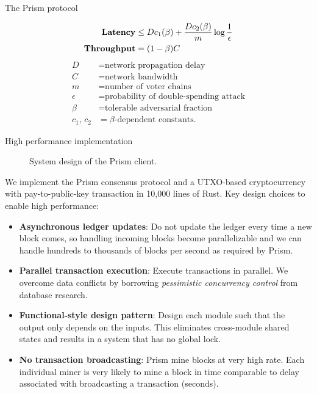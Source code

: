 \documentclass[final]{beamer}
\newlength{\colwidth}
\begin{document}
\begin{frame}[t]
\begin{columns}[t]
\begin{column}{\colwidth}
\begin{alertblock}{The Prism protocol}
  \begin{multicols}{2}
  \begin{align*}
   \text{\textbf{Latency}} &\leq D c_1(\beta) + \frac{D c_2(\beta)}{m}\log \frac{1}{\epsilon} \\
   \text{\textbf{Throughput}} &= (1-\beta) C
  \end{align*}
  \break 
  \begin{align*}
      D &= \text{network propagation delay} \\
      C &= \text{network bandwidth} \\
      m &= \text{number of voter chains} \\
      \epsilon &= \text{probability of double-spending attack} \\
      \beta &= \text{tolerable adversarial fraction} \\
      c_1\text{, }c_2 &= \beta\text{-dependent constants.} 
  \end{align*}
  \end{multicols}
  \end{alertblock}
  
  \begin{block}{High performance implementation}
  
  \begin{figure}
      \centering
      
      \caption{System design of the Prism client.}
        \end{figure}

      We implement the Prism consensus protocol and a UTXO-based cryptocurrency with pay-to-public-key transaction in 10,000 lines of Rust. Key design choices to enable high performance:
      
      \begin{itemize}
          \item \textbf{Asynchronous ledger updates}: Do not update the ledger every time a new block comes, so handling incoming blocks become parallelizable and we can handle hundreds to thousands of blocks per second as required by Prism.
          \item \textbf{Parallel transaction execution}: Execute transactions in parallel. We overcome data conflicts by borrowing \textit{pessimistic concurrency control} from database research. 	 
          \item \textbf{Functional-style design pattern}: Design each module such that the output only depends on the inputs. This eliminates cross-module shared states and results in a system that has no global lock.
          \item \textbf{No transaction broadcasting}: Prism mine blocks at very high rate. Each individual miner is very likely to mine a block in time comparable to delay associated with broadcasting a transaction (seconds).
      \end{itemize}
  \end{block}
    

\end{column}
\end{columns}
\end{frame}
\end{document}
